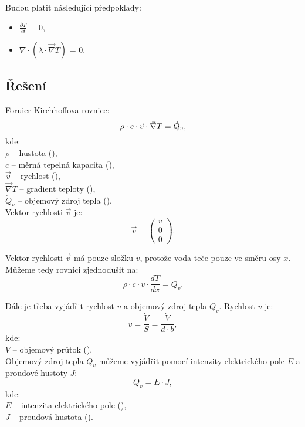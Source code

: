 \documentclass{article}
\begin{document}
Budou platit následující předpoklady:
\begin{itemize}
    \item $\frac{\partial T}{\partial t}$ = 0,
    \item $\nabla \cdot (\lambda \cdot \vec{\nabla} T)$ = 0.
\end{itemize}



\subsection{Řešení}

Foruier-Kirchhoffova rovnice:
\begin{equation}
    \rho \cdot c \cdot \vec{v} \cdot \vec{\nabla} T = \dot{Q}_v,
    \unit{(\ueqWandMinvcu)}
\end{equation}
kde:\\
$\rho$ -- hustota (\ueqKGandMinvcu),\\
$c$ -- měrná tepelná kapacita (\ueqJandKGinvKinv),\\
$\vec{v}$ -- rychlost (\ueqMandSinv),\\
$\vec{\nabla} T$ -- gradient teploty (\ueqKandMinv),\\
$\dot{Q}_v$ -- objemový zdroj tepla (\ueqWandMinvcu).\\

Vektor rychlosti $\vec{v}$ je:
$$
    \vec{v} = \begin{pmatrix} v \\ 0 \\ 0 \end{pmatrix}.
$$

Vektor rychlosti $\vec{v}$ má pouze složku $v$, protože voda teče pouze ve směru osy $x$. Můžeme tedy rovnici zjednodušit na:
$$
    \rho \cdot c \cdot v \cdot \frac{dT}{dx} = Q_v.
$$

Dále je třeba vyjádřit rychlost $v$ a objemový zdroj tepla $Q_v$. Rychlost $v$ je:
$$
    v = \frac{\dot{V}}{S} = \frac{\dot{V}}{d \cdot b},
$$
kde:\\
$\dot{V}$ -- objemový průtok (\ueqMcuSinv).\\

Objemový zdroj tepla $Q_v$ můžeme vyjádřit pomocí intenzity elektrického pole $E$ a proudové hustoty $J$:
$$
    Q_v = E \cdot J,
$$
kde:\\
$E$ -- intenzita elektrického pole (\ueqVandMinv),\\
$J$ -- proudová hustota (\ueqAandMinvsq).\\
\end{document}
